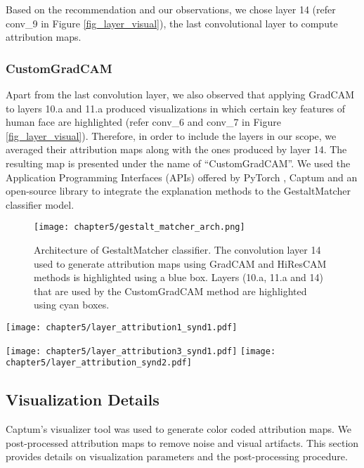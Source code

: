 \documentclass[../report.tex]{subfiles}
\begin{document}
	Based on the recommendation and our observations, we chose layer 14 (refer conv\_9 in Figure \ref{fig_layer_visual}), the last convolutional layer to compute attribution maps.\\
	\subsubsection{CustomGradCAM}
	Apart from the last convolution layer, we also observed that applying GradCAM to layers 10.a and 11.a produced visualizations in which certain key features of human face are highlighted (refer conv\_6 and conv\_7 in Figure \ref{fig_layer_visual}). Therefore, in order to include the layers in our scope, we averaged their attribution maps along with the ones produced by layer 14. The resulting map is presented under the name of \enquote{CustomGradCAM}. We used the Application Programming Interfaces (APIs) offered by PyTorch \cite{paszke2019pytorch}, Captum \cite{kokhlikyan2020captum} and an open-source library \cite{jacobgilpytorchcam} to integrate the explanation methods to the GestaltMatcher classifier model.
	\begin{figure}[H]
		\hspace*{1.0cm}      
		\texttt{[image: chapter5/gestalt\_matcher\_arch.png]}
		\caption{Architecture of GestaltMatcher classifier. The convolution layer 14 used to generate attribution maps using GradCAM and HiResCAM methods is highlighted using a blue box. Layers (10.a, 11.a and 14) that are used by the CustomGradCAM method are highlighted using cyan boxes. }
		\label{fig_arch_gest_matcher}
	\end{figure}
	\begin{sidewaysfigure}
	\texttt{[image: chapter5/layer\_attribution1\_synd1.pdf]}
	
	\texttt{[image: chapter5/layer\_attribution3\_synd1.pdf]}
	\label{fig_gm_pipeline}	      
	\texttt{[image: chapter5/layer\_attribution\_synd2.pdf]}
	\caption{Layer-wise visualization of attribution maps generated by GradCAM and HiResCAM methods.}
	\label{fig_layer_visual}
\end{sidewaysfigure}
	\subsection{Visualization Details}
	 Captum's visualizer tool was used to generate color coded attribution maps. We post-processed attribution maps to remove noise and visual artifacts. This section provides details on visualization parameters and the post-processing procedure.
\end{document}

